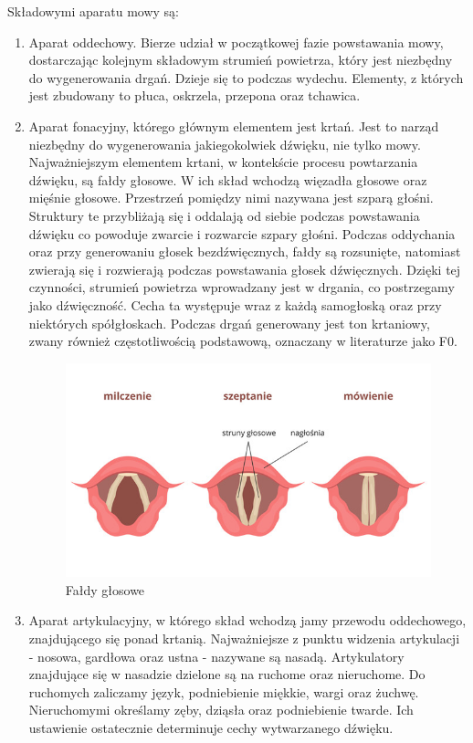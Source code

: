 \documentclass[a4paper,12 pt]{report}
\begin{document}
Składowymi aparatu mowy są:
\begin{enumerate}
\item Aparat oddechowy. Bierze udział w początkowej fazie powstawania mowy, dostarczając kolejnym składowym strumień powietrza, który jest niezbędny do wygenerowania drgań. Dzieje się to podczas wydechu. Elementy, z których jest zbudowany to płuca, oskrzela, przepona oraz tchawica.

\item Aparat fonacyjny, którego głównym elementem jest krtań. Jest to narząd niezbędny do wygenerowania jakiegokolwiek dźwięku, nie tylko mowy. Najważniejszym elementem krtani, w kontekście procesu powtarzania dźwięku, są fałdy głosowe. W ich skład wchodzą więzadła głosowe oraz mięśnie głosowe. Przestrzeń pomiędzy nimi nazywana jest szparą głośni. Struktury te przybliżają się i oddalają od siebie podczas powstawania dźwięku co powoduje zwarcie i rozwarcie szpary głośni. Podczas oddychania oraz przy generowaniu głosek bezdźwięcznych, fałdy są rozsunięte, natomiast zwierają się  i rozwierają podczas powstawania głosek dźwięcznych. 
Dzięki tej czynności, strumień powietrza wprowadzany jest w drgania, co postrzegamy jako dźwięczność. Cecha ta występuje wraz z każdą samogłoską oraz przy niektórych spółgłoskach. Podczas drgań generowany jest ton krtaniowy, zwany również częstotliwością podstawową, oznaczany w literaturze jako F0. 
\begin{figure}[!htbp]

\centering
\includegraphics[scale=0.5]{faldy_glosowe}
\caption{Fałdy głosowe ~\cite{krtan}}

\end{figure}
\FloatBarrier


\item Aparat artykulacyjny, w którego skład wchodzą jamy przewodu oddechowego, znajdującego się ponad krtanią. Najważniejsze z punktu widzenia artykulacji - nosowa, gardłowa oraz ustna - nazywane są nasadą. Artykulatory znajdujące się w nasadzie dzielone są na ruchome oraz nieruchome. Do ruchomych zaliczamy język, podniebienie miękkie, wargi oraz żuchwę. Nieruchomymi określamy zęby, dziąsła oraz podniebienie twarde. Ich ustawienie ostatecznie determinuje cechy wytwarzanego dźwięku. 
\end{enumerate}
\end{document}
